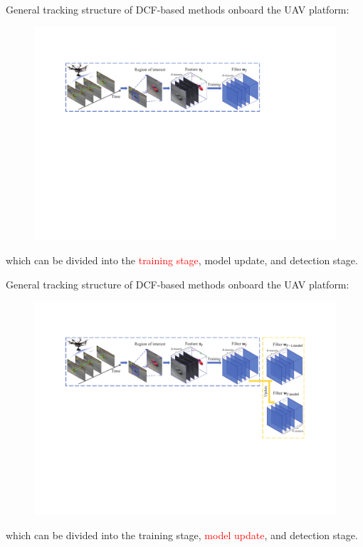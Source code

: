 \documentclass{beamer}
\begin{document}
\begin{frame}

    General tracking structure of DCF-based methods onboard the UAV platform:

    \begin{figure}[htpb]
        \begin{center}
            \includegraphics[width=0.7\linewidth, trim={100pt 100 100 90}]{fig/tracking_1.pdf}
        \end{center}
    \end{figure}

    which can be divided into the \textcolor{red}{training stage}, model update, and detection stage.

\end{frame}

\begin{frame}

    \addtocounter{footnote}{-1}
    General tracking structure of DCF-based methods onboard the UAV platform:

    \begin{figure}[htpb]
        \begin{center}
            \includegraphics[width=0.7\linewidth, trim={100pt 100 100 90}]{fig/tracking_2.pdf}
        \end{center}
    \end{figure}

    which can be divided into the training stage, \textcolor{red}{model update}, and detection stage.

\end{frame}
\end{document}
